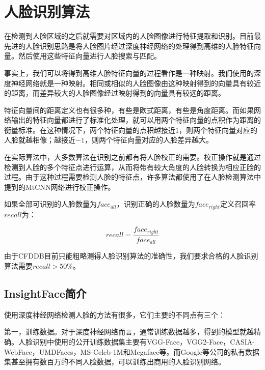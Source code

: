 \chapter{人脸识别算法}
\label{facerecognition}

在检测到人脸区域的之后就需要对区域内的人脸图像进行特征提取和识别。目前最先进的人脸识别思路是将人脸图片经过深度神经网络的处理得到高维的人脸特征向量。然后使用这些特征向量进行人脸搜索与匹配。

事实上，我们可以将得到高维人脸特征向量的过程看作是一种映射。我们使用的深度神经网络就是一种映射。相同或相似的人脸图像由这种映射得到的向量具有较近的距离，而差异较大的人脸图像经过映射得到的向量具有较远的距离。

特征向量间的距离定义也有很多种，有些是欧式距离，有些是角度距离。而如果网络输出的特征向量都进行了标准化处理，就可以用两个特征向量的点积作为距离的衡量标准。在这种情况下，两个特征向量的点积越接近$1$，则两个特征向量对应的人脸就越相像；越接近$-1$，则两个特征向量对应的人脸差异越大。

在实际算法中，大多数算法在识别之前都有将人脸校正的需要。校正操作就是通过检测到人脸的多个特征点进行运算，从而将带有较大角度的人脸转换为相应正脸的过程。由于这种过程需要检测人脸的特征点，许多算法都使用了在人脸检测算法中提到的MtCNN网络\cite{zhang2016joint}进行校正操作。

如果全部可识别的人脸数量为$face_{all}$，识别正确的人脸数量为$face_{right}$定义召回率$recall$为：

\begin{equation}
\label{eq:rrdef}
recall = \frac{face_{right}}{face_{all}} 
\end{equation}

由于CFDDB目前只能粗略测得人脸识别算法的准确性，我们要求合格的人脸识别算法需要$recall>50\%$。

\section{InsightFace\cite{deng2018arcface}简介}

使用深度神经网络检测人脸的方法有很多，它们主要的不同点有三个：

第一，训练数据。对于深度神经网络而言，通常训练数据越多，得到的模型就越精确。人脸识别中使用的公开训练数据集主要有VGG-Face\cite{parkhi2015deep}，VGG2-Face\cite{cao2017vggface2}，CASIA-WebFace\cite{yi2014learning}，UMDFaces\cite{bansal2017umdfaces}，MS-Celeb-1M\cite{guo2016msceleb}和Megaface\cite{nech2017level}等。而Google等公司的私有数据集甚至拥有数百万的不同人脸数据，可以训练出商用的人脸识别网络。

